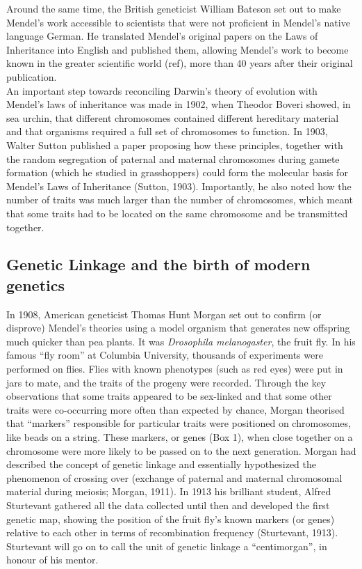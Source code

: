 Around the same time, the British geneticist William Bateson set out to make Mendel’s work accessible to scientists that were not proficient in Mendel’s native language German.
He translated Mendel’s original papers on the Laws of Inheritance into English and published them, allowing Mendel’s work to become known in the greater scientific world (ref), more than 40 years after their original publication.\\ 

An important step towards reconciling Darwin’s theory of evolution with Mendel’s laws of inheritance was made in 1902, when Theodor Boveri showed, in sea urchin, that different chromosomes contained different hereditary material and that organisms required a full set of chromosomes to function. 
In 1903, Walter Sutton published a paper proposing how these principles, together with the random segregation of paternal and maternal chromosomes during gamete formation (which he studied in grasshoppers) could form the molecular basis for Mendel’s Laws of Inheritance (Sutton, 1903). 
Importantly, he also noted how the number of traits was much larger than the number of chromosomes, which meant that some traits had to be located on the same chromosome and be transmitted together.

\subsection{Genetic Linkage and the birth of modern genetics} %

In 1908, American geneticist Thomas Hunt Morgan set out to confirm (or disprove) Mendel’s theories using a model organism that generates new offspring much quicker than pea plants. 
It was \textit{Drosophila melanogaster}, the fruit fly. 
In his famous “fly room” at Columbia University, thousands of experiments were performed on flies. 
Flies with known phenotypes (such as red eyes) were put in jars to mate, and the traits of the progeny were recorded. 
Through the key observations that some traits appeared to be sex-linked and that some other traits were co-occurring more often than expected by chance, Morgan theorised that “markers” responsible for particular traits were positioned on chromosomes, like beads on a string. 
These markers, or genes (Box 1), when close together on a chromosome were more likely to be passed on to the next generation. 
Morgan had described the concept of genetic linkage and essentially hypothesized the phenomenon of crossing over (exchange of paternal and maternal chromosomal material during meiosis; Morgan, 1911). 
In 1913 his brilliant student, Alfred Sturtevant gathered all the data collected until then and developed the first genetic map, showing the position of the fruit fly’s known markers (or genes) relative to each other in terms of recombination frequency (Sturtevant, 1913). 
Sturtevant will go on to call the unit of genetic linkage a “centimorgan”, in honour of his mentor.\\

